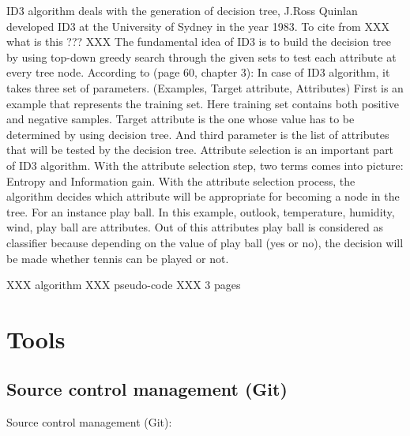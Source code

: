 \documentclass{article}
\begin{document}
ID3 algorithm deals with the generation of decision tree, J.Ross Quinlan developed ID3 at the University of Sydney in the year 1983. To cite from \cite{OverviewOfDecisionTrees} XXX what is this ??? XXX
The fundamental idea of ID3 is to build the decision tree by using top-down greedy search through the given sets to test each attribute at every tree node.
According to \cite{Mitchell1997MachineLearning}(page 60, chapter 3): In case of ID3 algorithm, it takes three set of parameters.
(Examples, Target attribute, Attributes)
First is an example that represents the training set. Here training set contains both positive and negative samples. Target attribute is the one whose value has to be determined by using decision tree. And third parameter is the list of attributes that will be tested by the decision tree. Attribute selection is an important part of ID3 algorithm. With the attribute selection step, two terms comes into picture: Entropy and Information gain. With the attribute selection process, the algorithm decides which attribute will be appropriate for becoming a node in the tree.
For an instance play ball. In this example, outlook, temperature, humidity, wind, play ball are attributes. Out of this attributes play ball is considered as classifier because depending on the value of play ball (yes or no), the decision will be made whether tennis can be played or not.

XXX algorithm XXX pseudo-code XXX 3 pages



\section{Tools}
\label{sec:Tools}

\subsection{Source control management (Git)}
\label{sec:scm}

Source control management (Git):
\end{document}
